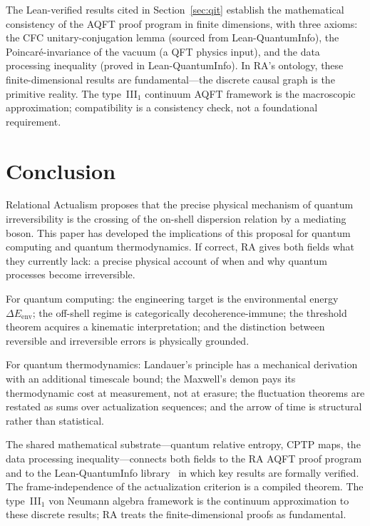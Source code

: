 \documentclass[11pt,a4paper]{article}
\theoremstyle{plain}
\theoremstyle{definition}
\theoremstyle{remark}
\begin{document}
The Lean-verified results cited in Section~\ref{sec:qit} establish the
mathematical consistency of the AQFT proof program in finite dimensions, with three
axioms: the CFC unitary-conjugation lemma (sourced from Lean-QuantumInfo), the
Poincar\'{e}-invariance of the vacuum (a QFT physics input), and the data
processing inequality (proved in Lean-QuantumInfo). In RA's ontology,
these finite-dimensional results are fundamental---the discrete causal
graph is the primitive reality. The type~III$_1$ continuum AQFT framework
is the macroscopic approximation; compatibility is a consistency check,
not a foundational requirement.

\section{Conclusion}

Relational Actualism proposes that the precise physical mechanism of quantum
irreversibility is the crossing of the on-shell dispersion relation by a mediating
boson. This paper has developed the implications of this proposal for quantum
computing and quantum thermodynamics. If correct, RA gives both fields what they
currently lack: a precise physical account of when and why quantum processes become
irreversible.

For quantum computing: the engineering target is the environmental energy
$\Delta E_{\mathrm{env}}$; the off-shell regime is categorically
decoherence-immune; the threshold theorem acquires a kinematic interpretation; and
the distinction between reversible and irreversible errors is physically grounded.

For quantum thermodynamics: Landauer's principle has a mechanical derivation with
an additional timescale bound; the Maxwell's demon pays its thermodynamic cost at
measurement, not at erasure; the fluctuation theorems are restated as sums over
actualization sequences; and the arrow of time is structural rather than
statistical.

The shared mathematical substrate---quantum relative entropy, CPTP maps, the data
processing inequality---connects both fields to the RA AQFT proof program and to
the Lean-QuantumInfo library~\citep{Meiburg2025LQI} in which key results are
formally verified. The frame-independence of the actualization criterion is a
compiled theorem. The type~III$_1$ von Neumann algebra framework is the
continuum approximation to these discrete results; RA treats the
finite-dimensional proofs as fundamental.
\end{document}
